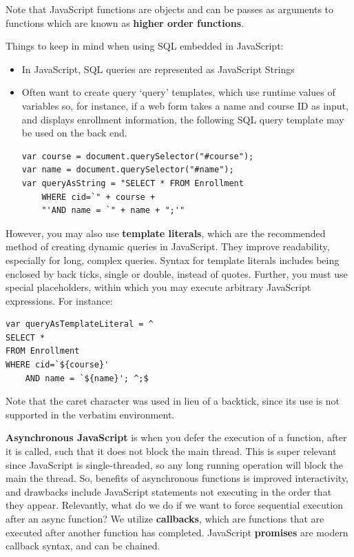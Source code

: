 \documentclass{article}
\begin{document}
Note that JavaScript functions are objects and can be passes as arguments to functions which are known as \textbf{higher order functions}.

Things to keep in mind when using SQL embedded in JavaScript:
\begin{itemize}
    \item In JavaScript, SQL queries are represented as JavaScript Strings
    \item Often want to create query `query' templates, which use runtime values of variables so, for instance, if a web form takes a name and course ID as input, and displays enrollment information, the following SQL query template may be used on the back end.

\begin{tcolorbox}
\begin{verbatim}
var course = document.querySelector("#course");
var name = document.querySelector("#name");
var queryAsString = "SELECT * FROM Enrollment 
    WHERE cid=`" + course +
    "'AND name = `" + name + ";'"
\end{verbatim}
\end{tcolorbox}
\end{itemize}

However, you may also use \textbf{template literals}, which are the recommended method of creating dynamic queries in JavaScript. They improve readability, especially for long, complex queries. Syntax for template literals includes being enclosed by back ticks, single or double, instead of quotes. Further, you must use special placeholders, within which you may execute arbitrary JavaScript expressions. For instance:

\begin{tcolorbox}
\begin{verbatim}
var queryAsTemplateLiteral = ^
SELECT *
FROM Enrollment
WHERE cid=`${course}'
    AND name = `${name}'; ^;$
\end{verbatim}
\end{tcolorbox}
Note that the caret character  was used in lieu of a backtick, since its use is not supported in the verbatim environment.

\textbf{Asynchronous JavaScript} is when you defer the execution of a function, after it is called, such that it does not block the main thread. This is super relevant since JavaScript is single-threaded, so any long running operation will block the main the thread. So, benefits of asynchronous functions is improved interactivity, and drawbacks include JavaScript statements not executing in the order that they appear. Relevantly, what do we do if we want to force sequential execution after an async function? We utilize \textbf{callbacks}, which are functions that are executed after another function has completed. JavaScript \textbf{promises} are modern callback syntax, and can be chained.
\end{document}
